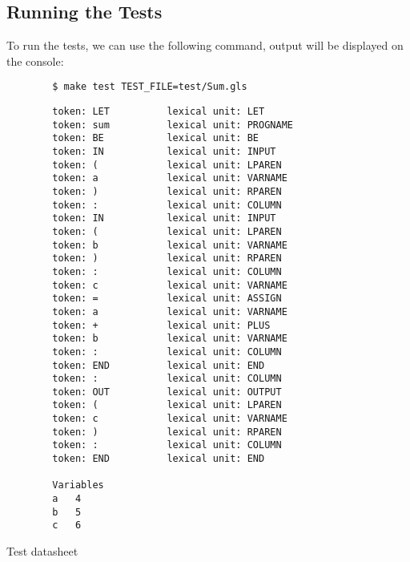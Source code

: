 	\subsection{Running the Tests}
	To run the tests, we can use the following command, output will be displayed on the console:
	\begin{verbatim}
		$ make test TEST_FILE=test/Sum.gls
    \end{verbatim}
  
    \begin{verbatim}
		token: LET        	lexical unit: LET
		token: sum        	lexical unit: PROGNAME
		token: BE         	lexical unit: BE
		token: IN         	lexical unit: INPUT
		token: (          	lexical unit: LPAREN
		token: a          	lexical unit: VARNAME
		token: )          	lexical unit: RPAREN
		token: :          	lexical unit: COLUMN
		token: IN         	lexical unit: INPUT
		token: (          	lexical unit: LPAREN
		token: b          	lexical unit: VARNAME
		token: )          	lexical unit: RPAREN
		token: :          	lexical unit: COLUMN
		token: c          	lexical unit: VARNAME
		token: =          	lexical unit: ASSIGN
		token: a          	lexical unit: VARNAME
		token: +          	lexical unit: PLUS
		token: b          	lexical unit: VARNAME
		token: :          	lexical unit: COLUMN
		token: END        	lexical unit: END
		token: :          	lexical unit: COLUMN
		token: OUT        	lexical unit: OUTPUT
		token: (          	lexical unit: LPAREN
		token: c          	lexical unit: VARNAME
		token: )          	lexical unit: RPAREN
		token: :          	lexical unit: COLUMN
		token: END        	lexical unit: END

		Variables
		a	4
		b	5
		c	6
	\end{verbatim}

    \begin{table}[h]
		\centering
		\caption{Test datasheet}
	\end{table}